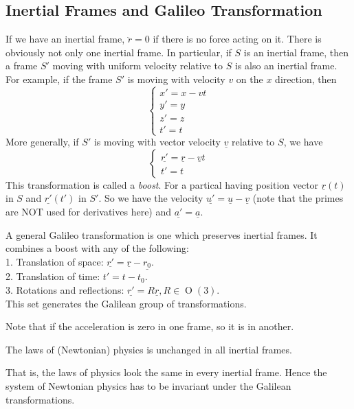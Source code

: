 \subsection{Inertial Frames and Galileo Transformation}
If we have an inertial frame, $\ddot{r}=0$ if there is no force acting on it.
There is obviously not only one inertial frame.
In particular, if $S$ is an inertial frame, then a frame $S'$ moving with uniform velocity relative to $S$ is also an inertial frame.
For example, if the frame $S'$ is moving with velocity $v$ on the $x$ direction, then
$$\begin{cases}
    x'=x-vt\\
    y'=y\\
    z'=z\\
    t'=t
\end{cases}$$
More generally, if $S'$ is moving with vector velocity $\underline{v}$ relative to $S$, we have
$$\begin{cases}
    \underline{r'}=\underline{r}-\underline{v}t\\
    t'=t
\end{cases}$$
This transformation is called a \textit{boost}.
For a partical having position vector $\underline{r}(t)$ in $S$ and $\underline{r'}(t')$ in $S'$.
So we have the velocity $\underline{u'}=\underline{u}-\underline{v}$ (note that the primes are NOT used for derivatives here) and $\underline{a'}=\underline{a}$.
\begin{definition}
    A general Galileo transformation is one which preserves inertial frames.
    It combines a boost with any of the following:\\
    1. Translation of space: $\underline{r'}=\underline{r}-\underline{r_0}$.\\
    2. Translation of time: $t'=t-t_0$.\\
    3. Rotations and reflections: $\underline{r'}=R\underline{r},R\in\operatorname{O}(3)$.\\
    This set generates the Galilean group of transformations.
\end{definition}
Note that if the acceleration is zero in one frame, so it is in another.
\begin{definition}
    The laws of (Newtonian) physics is unchanged in all inertial frames.
\end{definition}
That is, the laws of physics look the same in every inertial frame.
Hence the system of Newtonian physics has to be invariant under the Galilean transformations.
